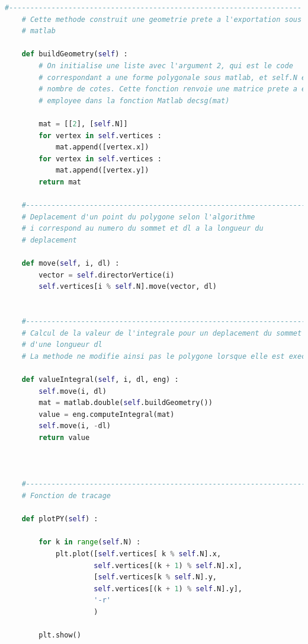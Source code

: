 \documentclass[a4paper,reqno]{article}
\begin{document}
\begin{lstlisting}[language=Python,frame=single,caption=Création de la classe Polygon]
    #---------------------------------------------------------------------    
    # Cette methode construit une geometrie prete a l'exportation sous 
    # matlab
    
    def buildGeometry(self) : 
        # On initialise une liste avec l'argument 2, qui est le code  
        # correspondant a une forme polygonale sous matlab, et self.N est le 
        # nombre de cotes. Cette fonction renvoie une matrice prete a etre  
        # employee dans la fonction Matlab decsg(mat)
        
        mat = [[2], [self.N]] 
        for vertex in self.vertices : 
            mat.append([vertex.x]) 
        for vertex in self.vertices : 
            mat.append([vertex.y]) 
        return mat
        
    #---------------------------------------------------------------------    
    # Deplacement d'un point du polygone selon l'algorithme 
    # i correspond au numero du sommet et dl a la longueur du 
    # deplacement 
    
    def move(self, i, dl) : 
        vector = self.directorVertice(i) 
        self.vertices[i % self.N].move(vector, dl) 
    
        
    #----------------------------------------------------------------------   
    # Calcul de la valeur de l'integrale pour un deplacement du sommet i  
    # d'une longueur dl 
    # La methode ne modifie ainsi pas le polygone lorsque elle est executee 
    
    def valueIntegral(self, i, dl, eng) : 
        self.move(i, dl) 
        mat = matlab.double(self.buildGeometry())
        value = eng.computeIntegral(mat) 
        self.move(i, -dl) 
        return value 
        
    
    
    #----------------------------------------------------------------------   
    # Fonction de tracage 
    
    def plotPY(self) : 
        
        for k in range(self.N) : 
            plt.plot([self.vertices[ k % self.N].x,
                     self.vertices[(k + 1) % self.N].x],
                     [self.vertices[k % self.N].y,
                     self.vertices[(k + 1) % self.N].y],
                     '-r'
                     )
            
        plt.show()
\end{lstlisting}

\end{document}
